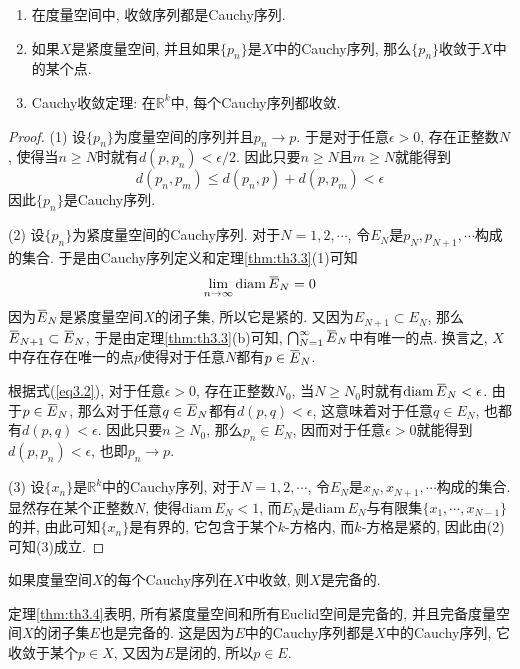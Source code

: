 \documentclass[cn,12pt,math=mtpro2,citestyle=gb7714-2015,bibstyle=gb7714-2015,twocol]{elegantbook}
\newcommand{\R}{\mathbb{R}}
\newcommand{\diam}{\text{diam}\,}
\newcommand{\bx}{x}
\newcommand{\limn}{\lim_{n\to\infty}}
\newcommand{\overbar}[1]{\mkern 1.5mu\overline{\mkern-1.5mu#1\mkern-1.5mu}\mkern 1.5mu}
\begin{document}
\begin{theorem}\label{thm:th3.4}
   \begin{enumerate}[label=(\arabic*)]
  \item 在度量空间中, 收敛序列都是Cauchy序列.

  \item 如果$X$是紧度量空间, 并且如果$\{p_n\}$是$X$中的Cauchy序列, 那么$\{p_n\}$收敛于$X$中的某个点.

  \item Cauchy收敛定理: 在$\R^k$中, 每个Cauchy序列都收敛.
  \end{enumerate}
\end{theorem}
\begin{proof}
  (1) 设$\{p_n\}$为度量空间的序列并且$p_n\rightarrow p$. 于是对于任意$\epsilon>0$, 存在正整数$N$, 使得当$n\geq N$时就有$d(p,p_n)<\epsilon/2$. 因此只要$n\geq N$且$m\geq N$就能得到
  $$d(p_n,p_m)\leq d(p_n,p)+d(p,p_m)<\epsilon$$
  因此$\{p_n\}$是Cauchy序列.

  (2) 设$\{p_n\}$为紧度量空间的Cauchy序列. 对于$N=1,2,\cdots$, 令$E_N$是$p_{N}, p_{N+1},\cdots$构成的集合. 于是由Cauchy序列定义和定理\textcolor[rgb]{1.00,0.53,0.09}{\ref{thm:th3.3}}(1)可知
  \begin{equation}\label{eq3.2}
  \limn  \diam\overbar{E}_N=0
  \end{equation}
  因为$\overbar{E}_N$是紧度量空间$X$的闭子集, 所以它是紧的. 又因为$E_{N+1}\subset E_N$, 那么$\overbar{E}_{N+1}\subset\overbar{E}_N$, 于是由定理\ref{thm:th3.3}(b)可知, $\bigcap_{N=1}^\infty\overbar{E}_N$中有唯一的点. 换言之, $X$中存在存在唯一的点$p$使得对于任意$N$都有$p\in\overbar{E}_N$.

  根据式(\ref{eq3.2}), 对于任意$\epsilon>0$, 存在正整数$N_0$, 当$N\geq N_0$时就有$\diam \overbar{E}_N<\epsilon$. 由于$p\in\overbar{E}_N$, 那么对于任意$q\in \overbar{E}_N$都有$d(p,q)<\epsilon$, 这意味着对于任意$q\in E_N$, 也都有$d(p,q)<\epsilon$. 因此只要$n\geq N_0$, 那么$p_n\in E_N$, 因而对于任意$\epsilon>0$就能得到$d(p,p_n)<\epsilon$, 也即$p_n\rightarrow p$.

  (3) 设$\{\bx_n\}$是$\R^k$中的Cauchy序列, 对于$N=1,2,\cdots$, 令$E_N$是$\bx_{N}, \bx_{N+1},\cdots$构成的集合. 显然存在某个正整数$N$, 使得$\diam E_N<1$, 而$E_N$是$\diam E_N$与有限集$\{\bx_1,\cdots,\bx_{N-1}\}$的并, 由此可知$\{\bx_n\}$是有界的, 它包含于某个$k$-方格内, 而$k$-方格是紧的, 因此由(2)可知(3)成立.

\end{proof}
\begin{definition}\label{def:def3.5}
如果度量空间$X$的每个Cauchy序列在$X$中收敛, 则$X$是完备的.
\end{definition}
\begin{remark}
定理\ref{thm:th3.4}表明, 所有紧度量空间和所有Euclid空间是完备的, 并且完备度量空间$X$的闭子集$E$也是完备的. 这是因为$E$中的Cauchy序列都是$X$中的Cauchy序列, 它收敛于某个$p\in X$, 又因为$E$是闭的, 所以$p \in E$.
\end{remark}
\end{document}
